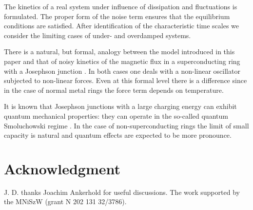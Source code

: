 \documentclass[a4paper,final]{appolb}
\begin{document}
The kinetics of a real system under influence of dissipation and fluctuations is formulated. 
The proper form of the noise term ensures that the equilibrium conditions are satisfied.   
After identification of the characteristic time scales we consider 
the limiting cases of under- and overdamped systems.  

There is a natural, but formal,   analogy between the model introduced in this paper 
and that of noisy kinetics of the magnetic flux in a superconducting ring with a 
Josephson junction \cite{junc}. In both cases one deals with a non-linear oscillator 
subjected to non-linear forces. Even at this formal level there is a difference 
since in the case of normal metal rings the force term depends on temperature.   
   
It is known that Josephson junctions with a large charging energy  can exhibit quantum 
mechanical properties: they can operate in the so-called quantum Smoluchowski regime \cite{ank}.  
 In the case of non-superconducting rings the limit of small  capacity is natural 
 and quantum effects are expected to be more pronounce. 



\section*{Acknowledgment}
\noindent  J. D. thanks Joachim Ankerhold for useful discussions.
The work  supported by   the MNiSzW (grant N 202 131 32/3786).
\end{document}
